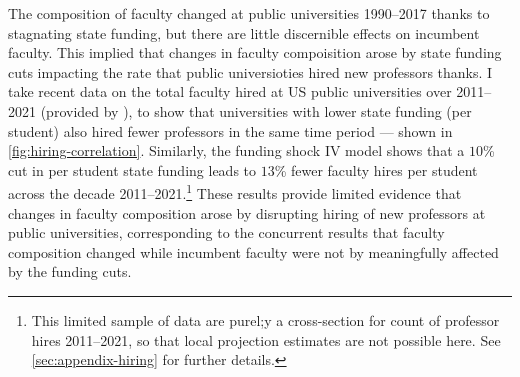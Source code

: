 The composition of faculty changed at public universities 1990--2017 thanks to stagnating state funding, but there are little discernible effects on incumbent faculty.
This implied that changes in faculty compoisition arose by state funding cuts impacting the rate that public universioties hired new professors thanks.
I take recent data on the total faculty hired at US public universities over 2011--2021 (provided by \citealt{wapman2022quantifying,wapman2022zenodo}), to show that universities with lower state funding (per student) also hired fewer professors in the same time period --- shown in \autoref{fig:hiring-correlation}.
Similarly, the funding shock IV model shows that a $10$\% cut in per student state funding leads to $13$\% fewer faculty hires per student across the decade 2011--2021.\footnote{
    This limited sample of data are purel;y a cross-section for count of professor hires 2011--2021, so that local projection estimates are not possible here.
    See \autoref{sec:appendix-hiring} for further details.
}
These results provide limited evidence that changes in faculty composition arose by disrupting hiring of new professors at public universities, corresponding to the concurrent results that faculty composition changed while incumbent faculty were not by meaningfully affected by the funding cuts.
